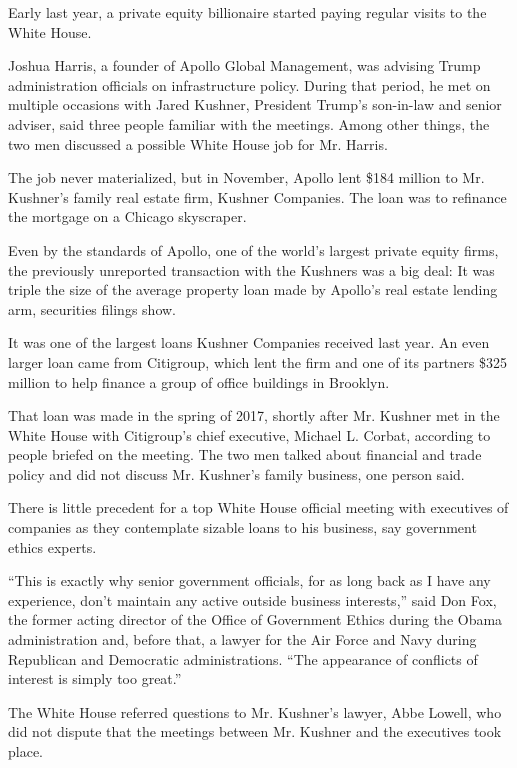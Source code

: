 Early last year, a private equity billionaire started paying regular
visits to the White House.

Joshua Harris, a founder of Apollo Global Management, was advising Trump
administration officials on infrastructure policy. During that period,
he met on multiple occasions with Jared Kushner, President Trump's
son-in-law and senior adviser, said three people familiar with the
meetings. Among other things, the two men discussed a possible White
House job for Mr. Harris.

The job never materialized, but in November, Apollo lent \$184 million
to Mr. Kushner's family real estate firm, Kushner Companies. The loan
was to refinance the mortgage on a Chicago skyscraper.

Even by the standards of Apollo, one of the world's largest private
equity firms, the previously unreported transaction with the Kushners
was a big deal: It was triple the size of the average property loan made
by Apollo's real estate lending arm, securities filings show.

It was one of the largest loans Kushner Companies received last year. An
even larger loan came from Citigroup, which lent the firm and one of its
partners \$325 million to help finance a group of office buildings in
Brooklyn.

That loan was made in the spring of 2017, shortly after Mr. Kushner met
in the White House with Citigroup's chief executive, Michael L. Corbat,
according to people briefed on the meeting. The two men talked about
financial and trade policy and did not discuss Mr. Kushner's family
business, one person said.

There is little precedent for a top White House official meeting with
executives of companies as they contemplate sizable loans to his
business, say government ethics experts.

``This is exactly why senior government officials, for as long back as I
have any experience, don't maintain any active outside business
interests,'' said Don Fox, the former acting director of the Office of
Government Ethics during the Obama administration and, before that, a
lawyer for the Air Force and Navy during Republican and Democratic
administrations. ``The appearance of conflicts of interest is simply too
great.''

The White House referred questions to Mr. Kushner's lawyer, Abbe Lowell,
who did not dispute that the meetings between Mr. Kushner and the
executives took place.

